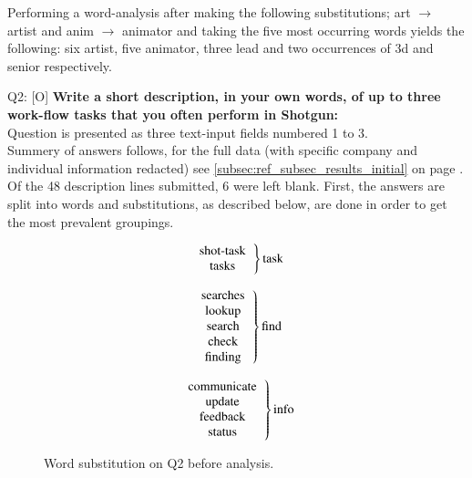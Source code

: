   Performing a word-analysis after making the following substitutions; art
  $\rightarrow$ artist and anim $\rightarrow$ animator and taking the five most
  occurring words yields the following: six artist, five animator, three lead and two
  occurrences of 3d and senior respectively. \\


  Q2: [O] \textbf{%
    Write a short description, in your own words, of up to three
    work-flow tasks that you often perform in Shotgun:
  } \\
  Question is presented as three text-input fields numbered 1 to 3.\\

  Summery of answers follows, for the full data (with specific company and
  individual information redacted) see \ref{subsec:ref_subsec_results_initial}
  on page \pageref{subsec:ref_subsec_results_initial}. Of the 48
  description lines submitted, 6 were left blank. First, the answers are split
  into words and substitutions, as described below, are done in order to get the
  most prevalent groupings. \vspace{-0.4cm}
  \begin{figure}[H]
    \begin{minipage}[c]{0.3\textwidth}
    \begin{equation*} \left. \begin{tabular}{c}
      \text{shot-task} \\
      \text{tasks} \\
    \end{tabular}\right \} \text{task} \end{equation*}
    \end{minipage}
    \begin{minipage}[c]{0.3\textwidth}
    \begin{equation*} \left. \begin{tabular}{c}
      \text{searches} \\
      \text{lookup} \\
      \text{search} \\
      \text{check} \\
      \text{finding} \\
    \end{tabular}\right \} \text{find} \end{equation*}
    \end{minipage}
    \begin{minipage}[c]{0.3\textwidth}
    \begin{equation*} \left. \begin{tabular}{c}
      \text{communicate} \\
      \text{update} \\
      \text{feedback} \\
      \text{status} \\
    \end{tabular}\right \} \text{info} \end{equation*}
    \end{minipage}
    \caption{Word substitution on Q2 before analysis.}
  \end{figure}

